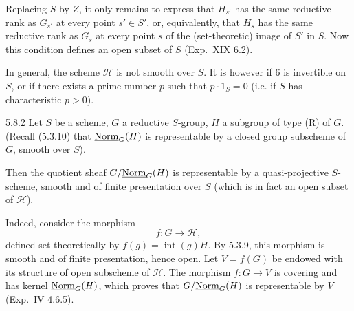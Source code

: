 Replacing $S$ by $Z$, it only remains to express that $H_{s'}$ has the same reductive rank as $G_{s'}$ at every point $s'\in S'$, or, equivalently, that $H_s$ has the same reductive rank as $G_s$ at every point $s$ of the (set-theoretic) image of $S'$ in $S$. Now this condition defines an open subset of $S$ (Exp.~XIX 6.2).
\begin{remark*}
In general, the scheme $\mathscr H$ is not smooth over $S$. It is however if $6$ is invertible on $S$, or if there exists a prime number $p$ such that $p\cdot1_S=0$ (i.e. if $S$ has characteristic $p>0$).
\end{remark*}
\begin{corollary}{5.8.2}\label{XXII.5.8.2}
Let $S$ be a scheme, $G$ a reductive $S$-group, $H$ a subgroup of type (R) of $G$. (Recall (5.3.10) that $\underline{\mathrm{Norm}}_G(H)$ is representable by a closed group subscheme of $G$, smooth over $S$).

Then the quotient sheaf $G/\underline{\mathrm{Norm}}_G(H)$ is representable by a quasi-projective $S$-scheme, smooth and of finite presentation over $S$ (which is in fact an open subset of $\mathscr H$).
\end{corollary}
Indeed, consider the morphism
\[
f:G\to\mathscr H,
\]
defined set-theoretically by $f(g)=\operatorname{int}(g)H$. By 5.3.9, this morphism is smooth and of finite presentation, hence open. Let $V=f(G)$ be endowed with its structure of open subscheme of $\mathscr H$. The morphism $f:G\to V$ is covering and has kernel $\underline{\mathrm{Norm}}_G(H)$, which proves that $G/\underline{\mathrm{Norm}}_G(H)$ is representable by $V$ (\cf Exp.~IV 4.6.5).
